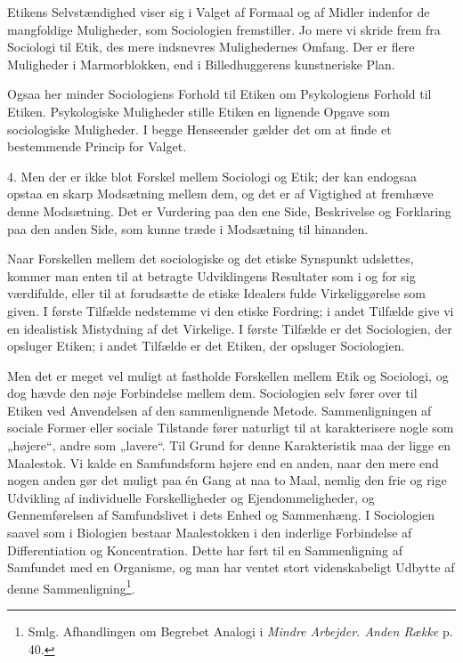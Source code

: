 \documentclass[12pt,a4paper,openany]{book}
\newcommand{\opage}[1]{\marginnote{\footnotesize\textit{[#1]}}}
\begin{document}
Etikens Selvstændighed viser sig i Valget af Formaal og
af Midler indenfor de mangfoldige Muligheder, som Sociologien
fremstiller. Jo mere vi skride frem fra Sociologi til Etik, des
mere indsnevres Mulighedernes Omfang. Der er flere Muligheder
i Marmorblokken, end i Billedhuggerens kunstneriske
Plan.

Ogsaa her minder Sociologiens Forhold til Etiken om Psykologiens
Forhold til Etiken. Psykologiske Muligheder stille
Etiken en lignende Opgave som sociologiske Muligheder. I
begge Henseender gælder det om at finde et bestemmende
Princip for Valget.

4. Men der er ikke blot Forskel mellem Sociologi og Etik;
der kan endogsaa opstaa en skarp Modsætning mellem dem, og
det er af Vigtighed at fremhæve denne Modsætning. Det er
Vurdering paa den ene Side, Beskrivelse og Forklaring paa
den anden Side, som kunne træde i Modsætning til hinanden.

Naar Forskellen mellem det sociologiske og det etiske
Synspunkt udslettes, kommer man enten til at betragte Udviklingens
Resultater som i og for sig værdifulde, eller til at forudsætte
de etiske Idealers fulde Virkeliggørelse som given. I
første Tilfælde nedstemme vi den etiske Fordring; i andet Tilfælde
give vi en idealistisk Mistydning af det Virkelige. I
første Tilfælde er det Sociologien, der opsluger Etiken; i andet
Tilfælde er det Etiken, der opsluger Sociologien.

Men det er meget vel muligt at fastholde Forskellen mellem
Etik og Sociologi, og dog hævde den nøje Forbindelse
\setcounter{footnote}{0}%
\opage{73}mellem dem. Sociologien selv fører over til Etiken ved Anvendelsen
af den sammenlignende Metode. Sammenligningen
af sociale Former eller sociale Tilstande fører naturligt til at
karakterisere nogle som „højere“, andre som „lavere“. Til Grund
for denne Karakteristik maa der ligge en Maalestok. Vi kalde
en Samfundsform højere end en anden, naar den mere end
nogen anden gør det muligt paa én Gang at naa to Maal,
nemlig den frie og rige Udvikling af individuelle Forskelligheder
og Ejendommeligheder, og Gennemførelsen af Samfundslivet
i dets Enhed og Sammenhæng. I Sociologien saavel som
i Biologien bestaar Maalestokken i den inderlige Forbindelse
af Differentiation og Koncentration. Dette har ført til en Sammenligning
af Samfundet med en Organisme, og man har ventet
stort videnskabeligt Udbytte af denne Sammenligning\footnote[1]{Smlg. Afhandlingen om Begrebet Analogi i \textit{Mindre Arbejder. Anden Række} p. 40.}.
\end{document}

